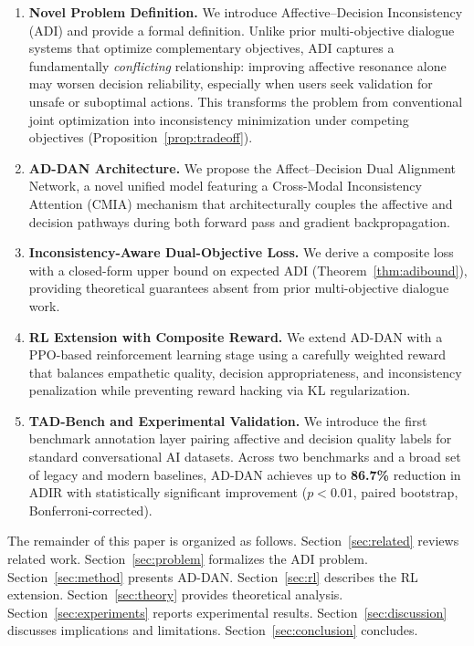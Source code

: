 \documentclass[lettersize,journal]{IEEEtran}
\begin{document}
\begin{enumerate}

\item \textbf{Novel Problem Definition.}  We introduce Affective--Decision
Inconsistency (ADI) and provide a formal definition.
Unlike prior multi-objective dialogue systems that optimize complementary
objectives, ADI captures a fundamentally \emph{conflicting} relationship:
improving affective resonance alone may worsen decision reliability,
especially when users seek validation for unsafe or suboptimal actions.
This transforms the problem from conventional joint optimization into
inconsistency minimization under competing objectives
(Proposition~\ref{prop:tradeoff}).

\item \textbf{AD-DAN Architecture.}  We propose the Affect--Decision Dual
Alignment Network, a novel unified model featuring a Cross-Modal
Inconsistency Attention (CMIA) mechanism that architecturally couples the
affective and decision pathways during both forward pass and gradient
backpropagation.

\item \textbf{Inconsistency-Aware Dual-Objective Loss.}  We derive a
composite loss with a closed-form upper bound on expected ADI
(Theorem~\ref{thm:adibound}), providing theoretical guarantees absent from
prior multi-objective dialogue work.

\item \textbf{RL Extension with Composite Reward.}  We extend AD-DAN with a
PPO-based reinforcement learning stage using a carefully weighted reward that
balances empathetic quality, decision appropriateness, and inconsistency
penalization while preventing reward hacking via KL regularization.

\item \textbf{TAD-Bench and Experimental Validation.}  We introduce the first
benchmark annotation layer pairing affective and decision quality labels for
standard conversational AI datasets.  Across two benchmarks and a broad set of
legacy and modern baselines,
AD-DAN achieves up to \textbf{86.7\%} reduction in ADIR with statistically
significant improvement ($p{<}0.01$, paired bootstrap, Bonferroni-corrected).

\end{enumerate}

The remainder of this paper is organized as follows.
Section~\ref{sec:related} reviews related work.
Section~\ref{sec:problem} formalizes the ADI problem.
Section~\ref{sec:method} presents AD-DAN.
Section~\ref{sec:rl} describes the RL extension.
Section~\ref{sec:theory} provides theoretical analysis.
Section~\ref{sec:experiments} reports experimental results.
Section~\ref{sec:discussion} discusses implications and limitations.
Section~\ref{sec:conclusion} concludes.
\end{document}
